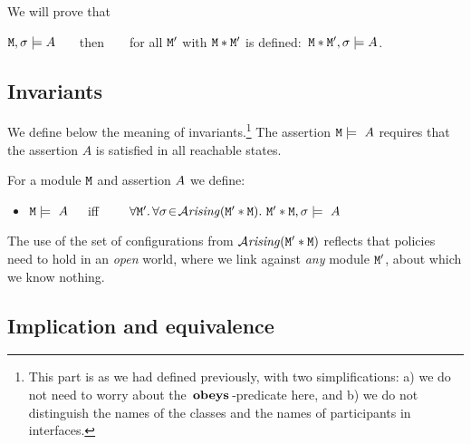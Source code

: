\documentclass[acmsmall,screen]{acmart}
\begin{document}
\vspace{.2in}
We will prove that

\begin{lemma}

${\mbox{\tt{M}}},\sigma \models A$  \ \ \ then\ \ \ \   for all ${\mbox{\tt{M}}}'$ with ${\mbox{\tt{M}}}*{\mbox{\tt{M}}}'$ is defined:\ ${\mbox{\tt{M}}}*{\mbox{\tt{M}}}',\sigma \models A$.
\end{lemma}




\subsection{Invariants}

We define below the meaning of invariants.\footnote{This part is as we had defined previously, with two simplifications: a) we do not need to worry about the $\,\textbf{\textrm{obeys}}\,$-predicate here, and b) we do not distinguish the names of the classes and the names of participants in interfaces.}
The assertion ${\mbox{\tt{M}}}   \models\  A$ requires that  the assertion $A$ is satisfied
in all reachable states.

\begin{definition}[Invariants]
\label{def:invariant}
\noindent
For a module ${\mbox{\tt{M}}}$  and assertion $A$ we define:\\

 \begin{itemize}
 \item
${\mbox{\tt{M}}}   \models\  A$\ \ \  iff\ \ \ \
$\forall {\mbox{\tt{M}}}'.\, \forall \sigma\!\in\!{\mathcal{A}}\textrm{\textit{rising}}({\mbox{\tt{M}}}'*{\mbox{\tt{M}}}).\ {\mbox{\tt{M}}}'*{\mbox{\tt{M}}},\sigma \models \  A$
 \end{itemize}
\end{definition}

The use of the set of configurations from ${\mathcal{A}}\textrm{\textit{rising}}({\mbox{\tt{M}}}'*{\mbox{\tt{M}}})$ reflects that policies
 need to hold in an {\em open} world, where
we link against {\em any} module ${\mbox{\tt{M}}}'$,
about which we know nothing.

\subsection{Implication and equivalence}
\end{document}
